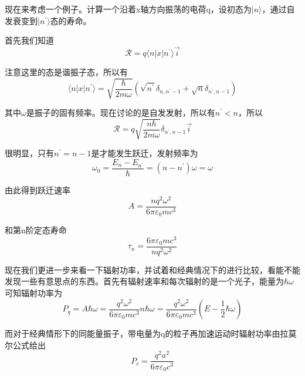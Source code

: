 \documentclass[UTF8]{ctexart}
\begin{document}
    现在来考虑一个例子。计算一个沿着x轴方向振荡的电荷q，设初态为$| n \rangle$，通过自发衰变到$| n^{\prime} \rangle$态的寿命。

    首先我们知道
    \begin{equation}
        \mathbf{\mathcal{R}} = q \langle n | x | n^{\prime} \rangle \vec{i}
    \end{equation}

\noindent 注意这里的态是谐振子态，所以有
\begin{equation}
    \langle n | x | n^{\prime} \rangle  = \sqrt{\frac{\hbar}{2 m \omega}} (\sqrt{n^{\prime}} \delta_{n,n^{\prime}-1} + \sqrt{n} \delta_{n^{\prime},n-1})
\end{equation}

\noindent 其中$\omega$是振子的固有频率。现在讨论的是自发发射，所以有$ n^{\prime} < n $，所以
\begin{equation}
    \mathbf{\mathcal{R}} = q \sqrt{\frac{n\hbar}{2m\omega}} \delta_{n^{\prime},n-1} \vec{i}
\end{equation}

\noindent 很明显，只有$n^{\prime} = n-1$是才能发生跃迁，发射频率为
\begin{equation}
    \omega_0 = \frac{E_n-E_{n^{\prime}}}{\hbar} = (n-n^{\prime})\omega =\omega 
\end{equation}

\noindent 由此得到跃迁速率
\begin{equation}
    A = \frac{nq^2 \omega^2}{6 \pi \varepsilon_0 m c^3}
\end{equation}

\noindent 和第n阶定态寿命
\begin{equation}
    \tau_n = \frac{6 \pi \varepsilon_0 m c^3}{n q^2 \omega^2}
\end{equation}

    现在我们更进一步来看一下辐射功率，并试着和经典情况下的进行比较，看能不能发现一些有意思点的东西。首先有辐射速率和每次辐射的是一个光子，能量为$\hbar \omega$可知辐射功率为
    \begin{equation}
        P_q = A \hbar \omega = \frac{q^2 \omega^2}{6 \pi \varepsilon_0 m c^3}n \hbar \omega = \frac{q^2 \omega^2}{6 \pi \varepsilon_0 m c^3}\left(E-\frac{1}{2}\hbar \omega\right)
    \end{equation}

\noindent 而对于经典情形下的同能量振子，带电量为q的粒子再加速运动时辐射功率由拉莫尔公式给出
\begin{equation}
    P_c = \frac{q^2 a^2}{6 \pi \varepsilon_0 c^3}
\end{equation}
\end{document}
